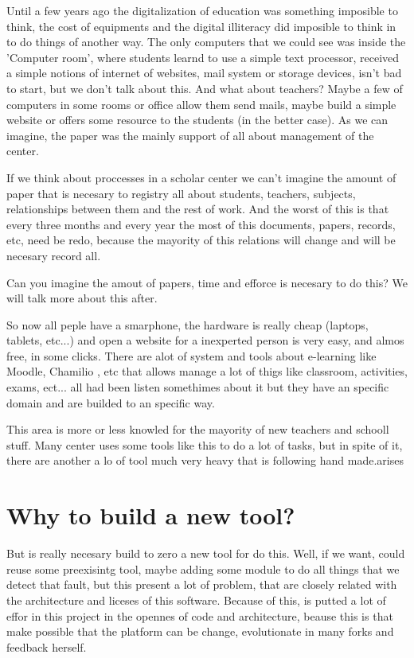 \documentclass[oneside,english,titlepage]{scrbook}
\begin{document}
Until a few years ago the digitalization of education was something
imposible to think, the cost of equipments and the digital illiteracy
did imposible to think in to do things of another way. The only computers
that we could see was inside the 'Computer room', where students learnd
to use a simple text processor, received a simple notions of internet
of websites, mail system or storage devices, isn't bad to start, but
we don't talk about this. And what about teachers? Maybe a few of
computers in some rooms or office allow them send mails, maybe build
a simple website or offers some resource to the students (in the better
case). As we can imagine, the paper was the mainly support of all
about management of the center.

If we think about proccesses in a scholar center we can't imagine
the amount of paper that is necesary to registry all about students,
teachers, subjects, relationships between them and the rest of work.
And the worst of this is that every three months and every year the
most of this documents, papers, records, etc, need be redo, because
the mayority of this relations will change and will be necesary record
all.

Can you imagine the amout of papers, time and efforce is necesary
to do this? We will talk more about this after.

So now all peple have a smarphone, the hardware is really cheap (laptops,
tablets, etc...) and open a website for a inexperted person is very
easy, and almos free, in some clicks. There are alot of system and
tools about e-learning like Moodle, Chamilio , etc that allows manage
a lot of thigs like classroom, activities, exams, ect... all had been
listen somethimes about it but they have an specific domain and are
builded to an specific way.

This area is more or less knowled for the mayority of new teachers
and schooll stuff. Many center uses some tools like this to do a lot
of tasks, but in spite of it, there are another a lo of tool much
very heavy that is following hand made.arises

\section{Why to build a new tool?}

But is really necesary build to zero a new tool for do this. Well,
if we want, could reuse some preexisintg tool, maybe adding some module
to do all things that we detect that fault, but this present a lot
of problem, that are closely related with the architecture and liceses
of this software. Because of this, is putted a lot of effor in this
project in the opennes of code and architecture, beause this is that
make possible that the platform can be change, evolutionate in many
forks and feedback herself.
\end{document}
